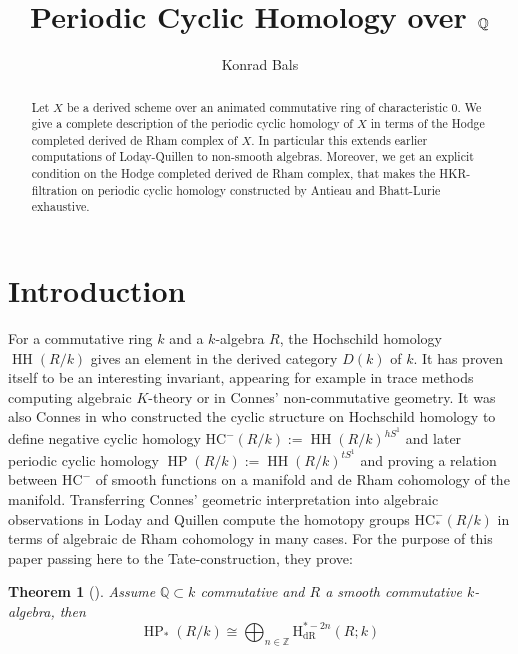 \documentclass[10pt, reqno]{amsart}
\title[Periodic Cyclic Homology over $\Q$]{Periodic Cyclic Homology over $\Q$}
\author[Konrad Bals]{Konrad Bals}
\newtheorem{theorem}{Theorem}[section]
\theoremstyle{definition}
\theoremstyle{remark}
\newcommand{\Q}{\mathbb{Q}}
\newcommand{\Z}{\mathbb{Z}}
\renewcommand{\H}{\mathrm{H}}
\newcommand{\dR}{\mathrm{dR}}
\DeclareMathOperator{\HH}{\mathrm{HH}}
\newcommand{\HC}{\mathrm{HC}^-}
\DeclareMathOperator{\HP}{\mathrm{HP}}
\begin{document}
	
	
	\begin{abstract}
		Let $X$ be a derived scheme over an animated commutative ring of characteristic 0. We give a complete description of the periodic cyclic homology of $X$ in terms of the Hodge completed derived de Rham complex of $X$. In particular this extends earlier computations of Loday-Quillen to non-smooth algebras. Moreover, we get an explicit condition on the Hodge completed derived de Rham complex, that makes the HKR-filtration on periodic cyclic homology constructed by Antieau and Bhatt-Lurie exhaustive.
	\end{abstract}
	
	\maketitle
	
	
	\section{Introduction}
	
	For a commutative ring $k$ and a $k$-algebra $R$, the Hochschild homology $\HH(R/k)$ gives an element in the derived category $D(k)$ of $k$. It has proven itself to be an interesting invariant, appearing for example in trace methods computing algebraic $K$-theory or in Connes' non-commutative geometry. It was also Connes in \cite{Con85} who constructed the cyclic structure on Hochschild homology to define negative cyclic homology $\HC(R/k):=\HH(R/k)^{hS^1}$ and later periodic cyclic homology $\HP(R/k):=\HH(R/k)^{tS^1}$ and proving a relation between $\HC$ of smooth functions on a manifold and de Rham cohomology of the manifold. Transferring Connes' geometric interpretation into algebraic observations in \cite{LQ84} Loday and Quillen compute the homotopy groups $\HC_*(R/k)$ in terms of algebraic de Rham cohomology in many cases. For the purpose of this paper passing here to the Tate-construction, they prove:
	
	\begin{theorem}[\cite{LQ84}]\label{LQ} Assume $\Q\subset k$ commutative and $R$ a smooth commutative $k$-algebra, then
	\[\HP_*(R/k)\cong \bigoplus_{n\in\Z}\H_{\dR}^{*-2n}(R;k)\]
	\end{theorem}
\end{document}
